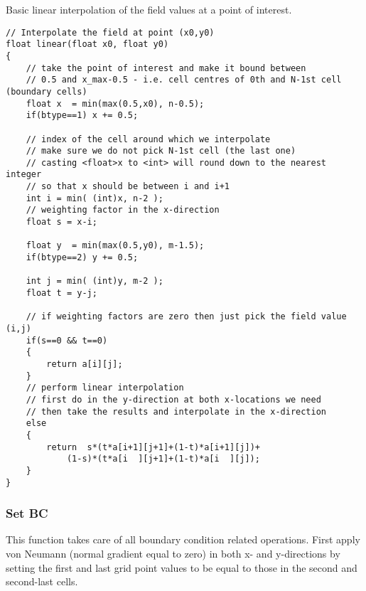 \documentclass[notitlepage]{article}
\begin{document}
Basic linear interpolation of the field values at a point of interest.

\begin{lstlisting}[style=myCpp]
// Interpolate the field at point (x0,y0)
float linear(float x0, float y0)
{
	// take the point of interest and make it bound between
	// 0.5 and x_max-0.5 - i.e. cell centres of 0th and N-1st cell (boundary cells)
	float x  = min(max(0.5,x0), n-0.5);
	if(btype==1) x += 0.5;
	
	// index of the cell around which we interpolate
	// make sure we do not pick N-1st cell (the last one)
	// casting <float>x to <int> will round down to the nearest integer
	// so that x should be between i and i+1
	int i = min( (int)x, n-2 ); 
	// weighting factor in the x-direction
	float s = x-i;
	
	float y  = min(max(0.5,y0), m-1.5);
	if(btype==2) y += 0.5;
	
	int j = min( (int)y, m-2 );
	float t = y-j;
	
	// if weighting factors are zero then just pick the field value (i,j)
	if(s==0 && t==0)
	{
		return a[i][j];
	}
	// perform linear interpolation
	// first do in the y-direction at both x-locations we need
	// then take the results and interpolate in the x-direction
	else
	{
		return  s*(t*a[i+1][j+1]+(1-t)*a[i+1][j])+
			(1-s)*(t*a[i  ][j+1]+(1-t)*a[i  ][j]);
	}
}
\end{lstlisting}

\subsubsection{Set BC}

This function takes care of all boundary condition related operations.
First apply von Neumann (normal gradient equal to zero) in both
x- and y-directions by setting the first and last grid point values to be equal to
those in the second and second-last cells.
\end{document}
